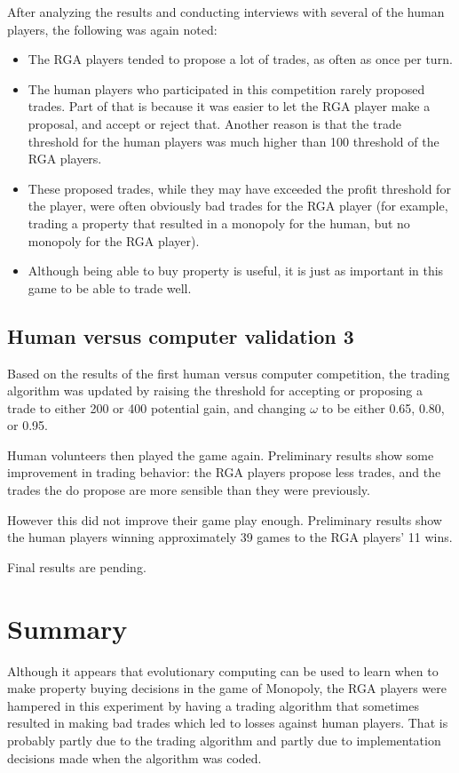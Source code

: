 After analyzing the results and conducting interviews with several of the human
players, the following was again noted:
\begin{itemize}
  \item {The RGA players tended to propose a lot of trades, as often
  as once per turn.}
  \item {The human players who participated in this competition rarely proposed
  trades. Part of that is because it was easier to let the RGA player make a
  proposal, and accept or reject that. Another reason is that the trade
  threshold for the human players was much higher than 100 threshold of the RGA
  players.}
  \item {These proposed trades, while they may have exceeded the profit
  threshold for the player, were often obviously bad trades for the RGA player
  (for example, trading a property that resulted in a monopoly for the human,
  but no monopoly for the RGA player).}
  \item {Although being able to buy property is useful, it is just as important
  in this game to be able to trade well.}
\end{itemize}

\subsection{Human versus computer validation 3} \label{6_humanVRGA3}

Based on the results of the first human versus computer competition, the trading
algorithm was updated by raising the threshold for accepting or proposing a
trade to either 200 or 400 potential gain, and changing \(\omega\) to be either
0.65, 0.80, or 0.95.

Human volunteers then played the game again. Preliminary results show some
improvement in trading behavior: the RGA players propose less trades, and the
trades the do propose are more sensible than they were previously.

However this did not improve their game play enough. Preliminary results show
the human players winning approximately 39 games to the RGA players' 11 wins.

Final results are pending.
 
\section{Summary}

Although it appears that evolutionary computing can be used to learn when to
make property buying decisions in the game of Monopoly, the RGA players were
hampered in this experiment by having a trading algorithm that sometimes
resulted in making bad trades which led to losses against human players. That is
probably partly due to the trading algorithm and partly due to implementation
decisions made when the algorithm was coded.

